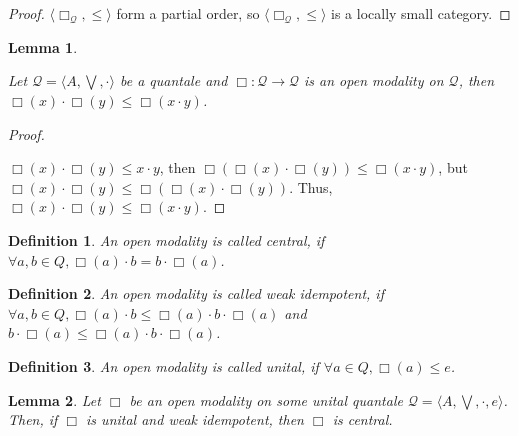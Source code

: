 \documentclass[a4paper]{article}
\newtheorem{lemma}{Lemma}
\newtheorem{defin}{Definition}
\begin{document}
\begin{proof}
  $\langle \Box_{\mathcal{Q}}, \leq \rangle$ form a partial order, so $\langle \Box_{\mathcal{Q}}, \leq \rangle$ is a locally small category.
\end{proof}

\begin{lemma}
$ $

  Let $\mathcal{Q} = \langle A, \bigvee, \cdot \rangle$ be a quantale and $\Box : \mathcal{Q} \to \mathcal{Q}$ is an open modality on $\mathcal{Q}$, then
  $\Box(x) \cdot \Box(y) \leq \Box(x \cdot y)$.
\end{lemma}

\begin{proof}
$ $

  $\Box(x) \cdot \Box(y) \leq x \cdot y$, then $\Box(\Box(x) \cdot \Box(y)) \leq \Box(x \cdot y)$, but
$\Box(x) \cdot \Box(y) \leq \Box(\Box(x) \cdot \Box(y))$. Thus, $\Box(x) \cdot \Box(y) \leq \Box(x \cdot y)$.
\end{proof}

\begin{defin}
  An open modality is called central, if $\forall a, b \in Q, \Box(a) \cdot b = b \cdot \Box(a)$.
\end{defin}

\begin{defin}
  An open modality is called weak idempotent, if $\forall a, b \in Q, \Box(a) \cdot b \leq \Box(a) \cdot b \cdot \Box(a)$ and
  $b \cdot \Box(a) \leq \Box(a) \cdot b \cdot \Box(a)$.
\end{defin}

\begin{defin}
  An open modality is called unital, if $\forall a \in Q, \Box(a) \leq e$.
\end{defin}

\begin{lemma}
  Let $\Box$ be an open modality on some unital quantale $\mathcal{Q} = \langle A, \bigvee, \cdot, e \rangle$.
  Then, if $\Box$ is unital and weak idempotent, then $\Box$ is central.
\end{lemma}
\end{document}
